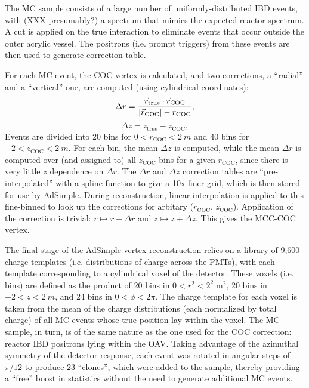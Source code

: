 \documentclass[../thesis.tex]{subfiles}
\begin{document}
The MC sample consists of a large number of uniformly-distributed IBD events, with (XXX presumably?) a spectrum that mimics the expected reactor spectrum. A cut is applied on the true interaction to eliminate events that occur outside the outer acrylic vessel. The positrons (i.e. prompt triggers) from these events are then used to generate correction table.

For each MC event, the COC vertex is calculated, and two corrections, a ``radial'' and a ``vertical'' one, are computed (using cylindrical coordinates):
\begin{equation*}
  \Delta r = \frac{\vec{r}_{\mathrm{true}} \cdot \vec{r}_{\mathrm{COC}}}{\lvert \vec{r}_{\mathrm{COC}}\rvert - r_{\mathrm{COC}}},
\end{equation*}
\begin{equation*}
  \Delta z = z_{\mathrm{true}} - z_{\mathrm{COC}},
\end{equation*}
Events are divided into 20 bins for $0 < r_{\mathrm{COC}} < \SI{2}{m}$ and 40 bins for $-2 < z_{\mathrm{COC}} < \SI{2}{m}$. For each bin, the mean $\Delta z$ is computed, while the mean $\Delta r$ is computed over (and assigned to) all $z{_\mathrm{COC}}$ bins for a given $r_{\mathrm{COC}}$, since there is very little $z$ dependence on $\Delta r$. The $\Delta r$ and $\Delta z$ correction tables are ``pre-interpolated'' with a spline function to give a 10x-finer grid, which is then stored for use by AdSimple. During reconstruction, linear interpolation is applied to this fine-binned to look up the corrections for arbitary ($r_{\mathrm{COC}}$, $z_{\mathrm{COC}}$). Application of the correction is trivial: $r \mapsto r + \Delta r$ and $z \mapsto z + \Delta z$. This gives the MCC-COC vertex.

The final stage of the AdSimple vertex reconstruction relies on a library of 9,600 charge templates (i.e. distributions of charge across the PMTs), with each template corresponding to a cylindrical voxel of the detector. These voxels (i.e. bins) are defined as the product of 20 bins in $0 < r^2 < 2^2\;\mathrm{m}^2$, 20 bins in $-2 < z < \SI{2}{m}$, and 24 bins in $0 < \phi < 2\pi$. The charge template for each voxel is taken from the mean of the charge distributions (each normalized by total charge) of all MC events whose true position lay within the voxel. The MC sample, in turn, is of the same nature as the one used for the COC correction: reactor IBD positrons lying within the OAV. Taking advantage of the azimuthal symmetry of the detector response, each event was rotated in angular steps of $\pi/12$ to produce 23 ``clones'', which were added to the sample, thereby providing a ``free'' boost in statistics without the need to generate additional MC events.
\end{document}
